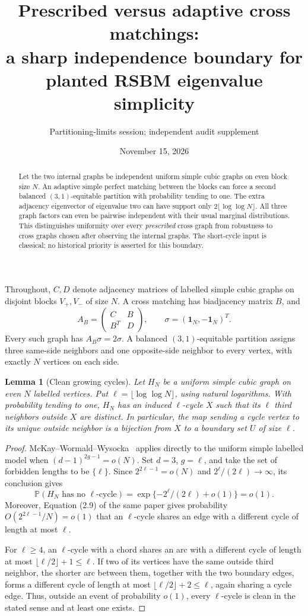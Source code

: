 \documentclass[11pt]{article}
\title{Prescribed versus adaptive cross matchings:\\
a sharp independence boundary for planted RSBM eigenvalue simplicity}
\author{Partitioning-limits session; independent audit supplement}
\date{November 15, 2026}
\newtheorem{lemma}{Lemma}
\newcommand{\one}{\mathbf 1}
\newcommand{\Prob}{\mathbb P}
\begin{document}
\maketitle
\begin{abstract}
Let the two internal graphs be independent uniform simple cubic graphs
on even block size $N$. An adaptive simple perfect matching between
the blocks can force a second balanced $(3,1)$-equitable partition with
probability tending to one. The extra adjacency eigenvector of eigenvalue
two can have support only $2\lfloor\log\log N\rfloor$. All three graph
factors can even be pairwise independent with their usual marginal
distributions. This distinguishes
uniformity over every \emph{prescribed} cross graph from robustness to
cross graphs chosen after observing the internal graphs. The short-cycle
input is classical; no historical priority is asserted for this boundary.
\end{abstract}

Throughout, $C,D$ denote adjacency matrices of labelled simple cubic
graphs on disjoint blocks $V_+,V_-$ of size $N$. A cross matching has
biadjacency matrix $B$, and
\[
 A_B=\begin{pmatrix}C&B\\B^T&D\end{pmatrix},\qquad
 \sigma=(\one_N,-\one_N)^T.
\]
Every such graph has $A_B\sigma=2\sigma$. A balanced $(3,1)$-equitable
partition assigns three same-side neighbors and one opposite-side
neighbor to every vertex, with exactly $N$ vertices on each side.

\begin{lemma}[Clean growing cycles]\label{lem:cycle}
Let $H_N$ be a uniform simple cubic graph on even $N$ labelled vertices.
Put $\ell=\lfloor\log\log N\rfloor$, using natural logarithms. With
probability tending to one, $H_N$ has an induced $\ell$-cycle $X$ such
that its $\ell$ third neighbors outside $X$ are distinct. In particular,
the map sending a cycle vertex to its unique outside neighbor is a
bijection from $X$ to a boundary set $U$ of size $\ell$.
\end{lemma}
\begin{proof}
McKay--Wormald--Wysocka~\cite[Theorem 2]{MWW} applies directly to the
uniform simple labelled model when $(d-1)^{2g-1}=o(N)$. Set $d=3$,
$g=\ell$, and take the set of forbidden lengths to be $\{\ell\}$.
Since $2^{2\ell-1}=o(N)$ and $2^\ell/(2\ell)\to\infty$, its conclusion
gives
\[
 \Prob(H_N\text{ has no }\ell\text{-cycle})
             =\exp\{-2^\ell/(2\ell)+o(1)\}=o(1).
\]
Moreover, Equation (2.9) of the same paper gives probability
$O(2^{2\ell-1}/N)=o(1)$ that an $\ell$-cycle shares an edge with a
different cycle of length at most $\ell$.

For $\ell\ge4$, an $\ell$-cycle with a chord shares an arc with a
different cycle of length at most $\lfloor\ell/2\rfloor+1\le\ell$.
If two of its vertices have the same outside third neighbor, the
shorter arc between them, together with the two boundary edges,
forms a different cycle of length at most
$\lfloor\ell/2\rfloor+2\le\ell$, again sharing a cycle edge.
Thus, outside an event of probability $o(1)$, every $\ell$-cycle is
clean in the stated sense and at least one exists.
\end{proof}
\end{document}
